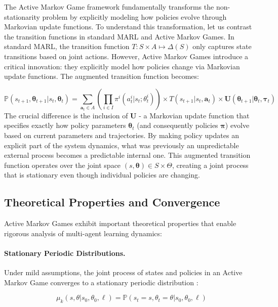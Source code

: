 \documentclass[a4paper,12pt]{report}
\begin{document}
The Active Markov Game framework fundamentally transforms the non-stationarity problem by explicitly modeling how policies evolve through Markovian update functions. To understand this transformation, let us contrast the transition functions in standard MARL and Active Markov Games. In standard MARL, the transition function $T: S \times A \mapsto \Delta(S)$ only captures state transitions based on joint actions. However, Active Markov Games introduce a critical innovation: they explicitly model how policies change via Markovian update functions. The augmented transition function becomes:

\begin{equation}
    \mathbb{P}(s_{t+1}, \boldsymbol{\theta}_{t+1}|s_t, \boldsymbol{\theta}_t) = \sum_{\mathbf{a}_t \in A} \left(\prod_{i \in I} \pi^i(a^i_t|s_t; \theta^i_t)\right) \times T(s_{t+1}|s_t, \mathbf{a}_t) \times \boldsymbol{U}(\boldsymbol{\theta}_{t+1}|\boldsymbol{\theta}_t, \boldsymbol{\tau}_t)
\end{equation}
The crucial difference is the inclusion of $\boldsymbol{U}$ - a Markovian update function that specifies exactly how policy parameters $\boldsymbol{\theta}_t$ (and consequently policies $\boldsymbol{\pi}$) evolve based on current parameters and trajectories. By making policy updates an explicit part of the system dynamics, what was previously an unpredictable external process becomes a predictable internal one. This augmented transition function operates over the joint space $(s, \boldsymbol{\theta}) \in S \times \Theta$, creating a joint process that is stationary even though individual policies are changing.


\subsection{Theoretical Properties and Convergence}

Active Markov Games exhibit important theoretical properties that enable rigorous analysis of multi-agent learning dynamics:

\paragraph{Stationary Periodic Distributions.} Under mild assumptions, the joint process of states and policies in an Active Markov Game converges to a stationary periodic distribution \cite{kim2022influencing}:

\begin{equation}
    \mu_k(s, \theta|s_0, \theta_0, \ell) = \mathbb{P}(s_t = s, \theta_t = \theta|s_0, \theta_0, \ell)
\end{equation}
\end{document}

